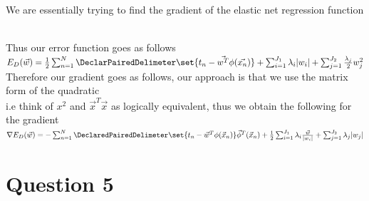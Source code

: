\documentclass{article}
\begin{document}
We are essentially trying to find the gradient of the elastic net regression function

\\ Thus our error function goes as follows
\\$E_{D}(\vec{w})=\frac{1}{2}\sum_{n=1}^{N} \DeclarPairedDelimeter\set\{t_{n}-\vec{w^{T}}\phi(\vec{x_{n}})\}+ \sum_{i=1}^{J_{1}} \lambda_{i}|w_{i}|+ \sum_{j=1}^{J_{2}} \frac{\lambda_{j}}{2}w_{j}^{2}$
\\ Therefore our gradient goes as follows, our approach is that we use the matrix form of the quadratic
\\ i.e think of $x^{2}$ and $\vec{x}^{T}\vec{x}$ as logically equivalent, thus we obtain the following for the gradient 
\\$\nabla E_{D}(\vec{w})=-\sum_{n=1}^{N}\DeclaredPairedDelimeter\set\{t_{n}-\vec{w}^{T}\phi(\vec{x}_{n})\}\vec{\phi}^{T}(\vec{x}_{n})+\frac{1}{2}\sum_{i=1}^{J_{1}}\lambda_{i}\frac{\vec{w}}{|w_{i}|}+\sum_{j=1}^{J_{2}}\lambda_{j}|w_{j}|$


\pagebreak

\section{Question 5}\label{sec:Question5}
\end{document}
